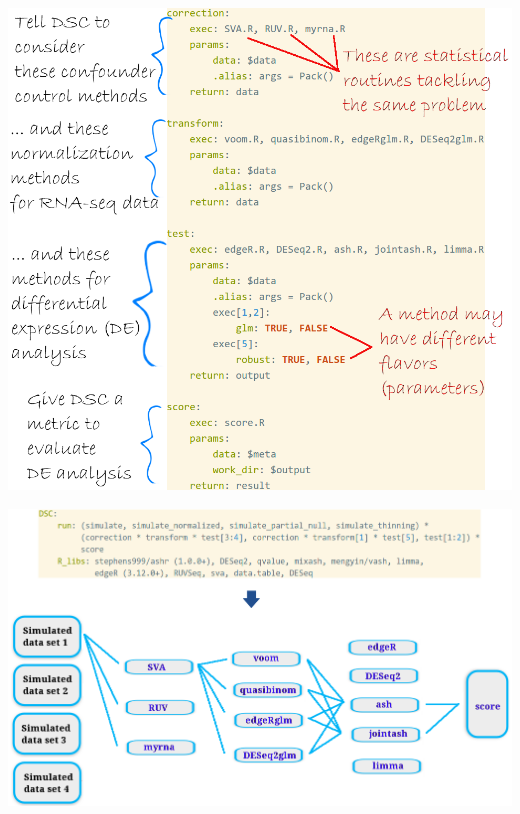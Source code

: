 \begin{withoutheadline}
\begin{frame}
  \centering \includegraphics[height=\textheight]{figs/dsc2}
\end{frame}
\end{withoutheadline}
\begin{withoutheadline}
\begin{frame}
  \centering \includegraphics[width=\textwidth]{figs/dsc3}
\end{frame}
\end{withoutheadline}
